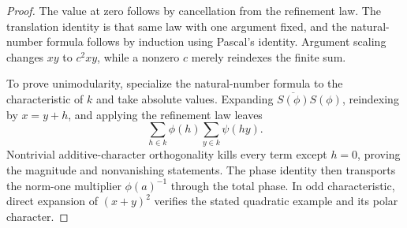 \begin{proof}
The value at zero follows by cancellation from the refinement law.
The translation identity is that same law with one argument fixed, and
the natural-number formula follows by induction using Pascal's identity.
Argument scaling changes $xy$ to $c^2xy$, while a nonzero $c$ merely
reindexes the finite sum.

To prove unimodularity, specialize the natural-number formula to the
characteristic of $k$ and take absolute values.  Expanding
$\overline{S(\phi)}S(\phi)$, reindexing by $x=y+h$, and applying the
refinement law leaves
\[
 \sum_{h\in k}\phi(h)\sum_{y\in k}\psi(hy).
\]
Nontrivial additive-character orthogonality kills every term except
$h=0$, proving the magnitude and nonvanishing statements.  The phase
identity then transports the norm-one multiplier $\phi(a)^{-1}$ through
the total phase.  In odd characteristic, direct expansion of
$(x+y)^2$ verifies the stated quadratic example and its polar character.
\end{proof}

